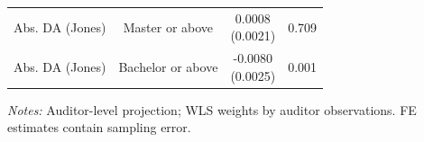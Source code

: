 \documentclass[10pt]{article}
\begin{document}
\begin{minipage}{19cm}
\begin{threeparttable}
\begin{tabular}{p{}ccc}
Abs. DA (Jones) & Master or above & \shortstack{0.0008\\(0.0021)} & 0.709 \\
Abs. DA (Jones) & Bachelor or above & \shortstack{-0.0080\\(0.0025)} & 0.001 \\
\bottomrule
\end{tabular}
\begin{tablenotes}\fontsize{9}{11}\selectfont
\item \raggedright \fontsize{9}{11}\selectfont \textit{Notes:} Auditor-level projection; WLS weights by auditor observations. FE estimates contain sampling error.
\end{tablenotes}
\end{threeparttable}

\end{minipage}
\end{document}
